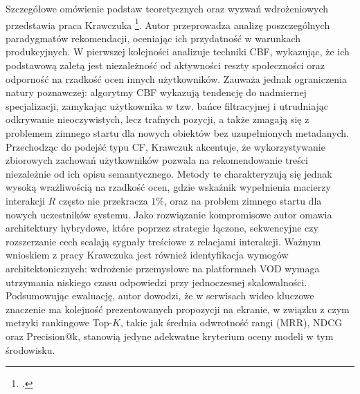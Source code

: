 Szczegółowe omówienie podstaw teoretycznych oraz wyzwań wdrożeniowych przedstawia praca Krawczuka \footcite{krawczukSystemyRekomendacyjne2024}. Autor przeprowadza analizę poszczególnych paradygmatów rekomendacji, oceniając ich przydatność w warunkach produkcyjnych. W pierwszej kolejności analizuje techniki CBF, wykazując, że ich podstawową zaletą jest niezależność od aktywności reszty społeczności oraz odporność na rzadkość ocen innych użytkowników. Zauważa jednak ograniczenia natury poznawczej: algorytmy CBF wykazują tendencję do nadmiernej specjalizacji, zamykając użytkownika w tzw. bańce filtracyjnej i utrudniając odkrywanie nieoczywistych, lecz trafnych pozycji, a także zmagają się z problemem zimnego startu dla nowych obiektów bez uzupełnionych metadanych. Przechodząc do podejść typu CF, Krawczuk akcentuje, że wykorzystywanie zbiorowych zachowań użytkowników pozwala na rekomendowanie treści niezależnie od ich opisu semantycznego. Metody te charakteryzują się jednak wysoką wrażliwością na rzadkość ocen, gdzie wskaźnik wypełnienia macierzy interakcji $R$ często nie przekracza $1\%$, oraz na problem zimnego startu dla nowych uczestników systemu. Jako rozwiązanie kompromisowe autor omawia architektury hybrydowe, które poprzez strategie łączone, sekwencyjne czy rozszerzanie cech scalają sygnały treściowe z relacjami interakcji. Ważnym wnioskiem z pracy Krawczuka jest również identyfikacja wymogów architektonicznych: wdrożenie przemysłowe na platformach VOD wymaga utrzymania niskiego czasu odpowiedzi przy jednoczesnej skalowalności. Podsumowując ewaluację, autor dowodzi, że w serwisach wideo kluczowe znaczenie ma kolejność prezentowanych propozycji na ekranie, w związku z czym metryki rankingowe Top-$K$, takie jak średnia odwrotność rangi (MRR), NDCG oraz Precision@\allowbreak k, stanowią jedyne adekwatne kryterium oceny modeli w tym środowisku.

